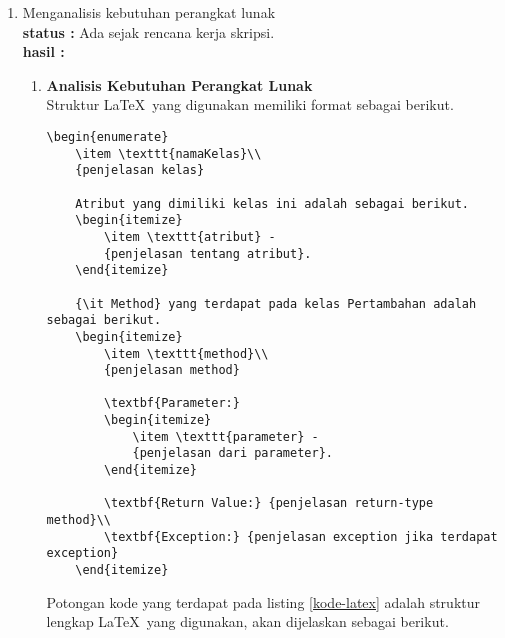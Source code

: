 \documentclass[a4paper,twoside]{article}
\begin{document}
\begin{enumerate}
		\item Menganalisis kebutuhan perangkat lunak\\
		{\bf status :} Ada sejak rencana kerja skripsi.\\
		{\bf hasil :} 
		\begin{enumerate}
			\item \textbf{Analisis Kebutuhan Perangkat Lunak}\\
Struktur \LaTeX\ yang digunakan memiliki format sebagai berikut.
\begin{lstlisting}[caption=Potongan kode \LaTeX, label={kode-latex}]
	\begin{enumerate}
	\item \texttt{namaKelas}\\
	{penjelasan kelas}
	
	Atribut yang dimiliki kelas ini adalah sebagai berikut.
	\begin{itemize}
		\item \texttt{atribut} -
		{penjelasan tentang atribut}.
	\end{itemize}
	
	{\it Method} yang terdapat pada kelas Pertambahan adalah sebagai berikut.
	\begin{itemize}
		\item \texttt{method}\\
		{penjelasan method}
		
		\textbf{Parameter:}
		\begin{itemize}
			\item \texttt{parameter} - 
			{penjelasan dari parameter}.
		\end{itemize}
		
		\textbf{Return Value:} {penjelasan return-type method}\\
		\textbf{Exception:} {penjelasan exception jika terdapat exception}
	\end{itemize}

\end{lstlisting}

Potongan kode yang terdapat pada listing \ref{kode-latex} adalah struktur lengkap \LaTeX\ yang digunakan, akan dijelaskan sebagai berikut.


\end{enumerate}
\end{enumerate}
\end{document}
